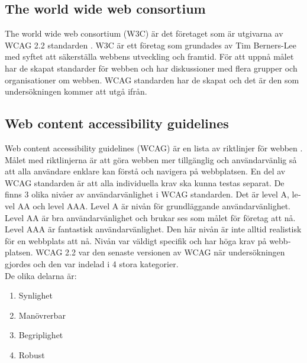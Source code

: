 \documentclass[11p]{article}
\begin{document}
\begin{otherlanguage}{swedish}
    \subsection{The world wide web consortium}
    The world wide web consortium (W3C) är det företaget som är utgivarna av WCAG 2.2 standarden \parencite{W3C}.
    W3C är ett företag som grundades av Tim Berners-Lee med syftet att säkerställa webbens utveckling och framtid.
    För att uppnå målet har de skapat standarder för webben och har diskussioner med flera grupper och organisationer om webben.
    WCAG standarden har de skapat och det är den som undersökningen kommer att utgå ifrån.

    \subsection{Web content accessibility guidelines} %
    Web content accessibility guidelines (WCAG) är en lista av riktlinjer för webben \parencite{WCAG_2.2}.
    Målet med riktlinjerna är att göra webben mer tillgänglig och användarvänlig så att alla användare enklare kan förstå och navigera på webbplatsen.
    En del av WCAG standarden är att alla individuella krav ska kunna testas separat.
    De finns 3 olika nivåer av användarvänlighet i WCAG standarden.
    Det är level A, level AA och level AAA.
    Level A är nivån för grundläggande användarvänlighet.
    Level AA är bra användarvänlighet och brukar ses som målet för företag att nå. %
    Level AAA är fantastisk användarvänlighet.
    Den här nivån är inte alltid realistisk för en webbplats att nå. %
    Nivån var väldigt specifik och har höga krav på webbplatsen.
    WCAG 2.2 var den senaste versionen av WCAG när undersökningen gjordes och den var indelad i 4 stora kategorier.
    \\De olika delarna är:
    \begin{enumerate}
        \item Synlighet %
        \item Manövrerbar
        \item Begriplighet
        \item Robust
    \end{enumerate}


\end{otherlanguage}
\end{document}
